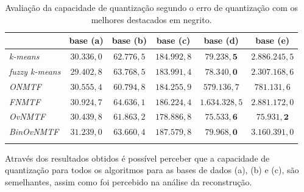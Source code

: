 \documentclass[
    12pt,                %
    oneside,            %
    a4paper,            %
    english,            %
    brazil                %
    ]{abntex2ppgsi}
\begin{document}
\begin{table}[H]
\centering
    \caption{Avaliação da capacidade de quantização segundo o erro de quantização com os melhores destacados em negrito.}
        \begin{tabular}{lccccc}
            \hline
            & \textbf{base (a)} & \textbf{base (b)} & \textbf{base (c)} & \textbf{base (d)} & \textbf{base (e)} \\
            \hline
            \textit{k-means}        & $30.336,0$ & $62.776,5$ & $184.992,8$ & $\mathbf{79.238,5}$  & $2.886.245,5$        \\

            \textit{fuzzy k-means}  & $29.402,8$ & $63.768,5$ & $183.991,4$ & $\mathbf{78.340,0}$  & $2.307.168,6$        \\


            \textit{ONMTF}          & $30.555,4$ & $60.794,8$ & $184.255,9$ & $579.136,7$          & $781.131,6$          \\

            \textit{FNMTF}          & $30.924,7$ & $64.636,1$ & $186.224,4$ & $1.634.328,5$        & $2.881.172,0$        \\

            \textit{OvNMTF}         & $30.439,8$ & $61.863,2$ & $178.886,8$ & $\mathbf{75.533,6}$  & $\mathbf{75.931,2}$  \\

            \textit{BinOvNMTF}      & $31.239,0$ & $63.660,4$ & $187.579,8$ & $\mathbf{79.968,0}$  & $3.160.391,0$        \\
            \hline \\
        \end{tabular}
        \label{tab:quantization}
\end{table}

Através dos resultados obtidos é possível perceber que a capacidade de quantização para todos os algoritmos para as bases de dados (a), (b) e (c), são semelhantes, assim como foi percebido na análise da reconstrução.
\end{document}
